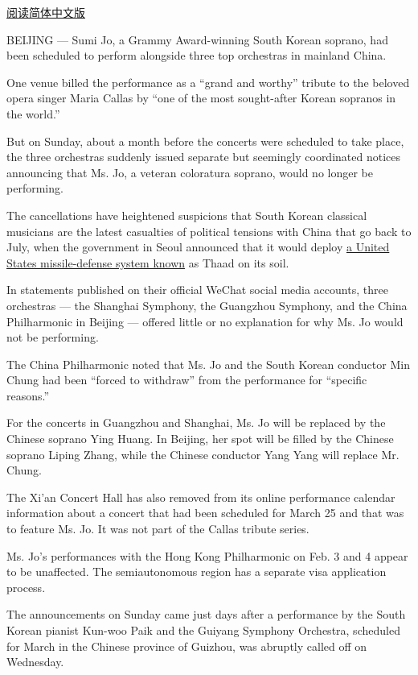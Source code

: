 \href{http://cn.nytimes.com/china/20170124/sumi-jo-soprano-maria-callas/}{阅读简体中文版}

BEIJING --- Sumi Jo, a Grammy Award-winning South Korean soprano, had
been scheduled to perform alongside three top orchestras in mainland
China.

One venue billed the performance as a ``grand and worthy'' tribute to
the beloved opera singer Maria Callas by ``one of the most sought-after
Korean sopranos in the world.''

But on Sunday, about a month before the concerts were scheduled to take
place, the three orchestras suddenly issued separate but seemingly
coordinated notices announcing that Ms. Jo, a veteran coloratura
soprano, would no longer be performing.

The cancellations have heightened suspicions that South Korean classical
musicians are the latest casualties of political tensions with China
that go back to July, when the government in Seoul announced that it
would deploy
\href{https://www.nytimes.com/2016/07/09/world/asia/south-korea-us-thaad-china.html}{a
United States missile-defense system known} as Thaad on its soil.

In statements published on their official WeChat social media accounts,
three orchestras --- the Shanghai Symphony, the Guangzhou Symphony, and
the China Philharmonic in Beijing --- offered little or no explanation
for why Ms. Jo would not be performing.

The China Philharmonic noted that Ms. Jo and the South Korean conductor
Min Chung had been ``forced to withdraw'' from the performance for
``specific reasons.''

For the concerts in Guangzhou and Shanghai, Ms. Jo will be replaced by
the Chinese soprano Ying Huang. In Beijing, her spot will be filled by
the Chinese soprano Liping Zhang, while the Chinese conductor Yang Yang
will replace Mr. Chung.

The Xi'an Concert Hall has also removed from its online performance
calendar information about a concert that had been scheduled for March
25 and that was to feature Ms. Jo. It was not part of the Callas tribute
series.

Ms. Jo's performances with the Hong Kong Philharmonic on Feb. 3 and 4
appear to be unaffected. The semiautonomous region has a separate visa
application process.

The announcements on Sunday came just days after a performance by the
South Korean pianist Kun-woo Paik and the Guiyang Symphony Orchestra,
scheduled for March in the Chinese province of Guizhou, was abruptly
called off on Wednesday.

